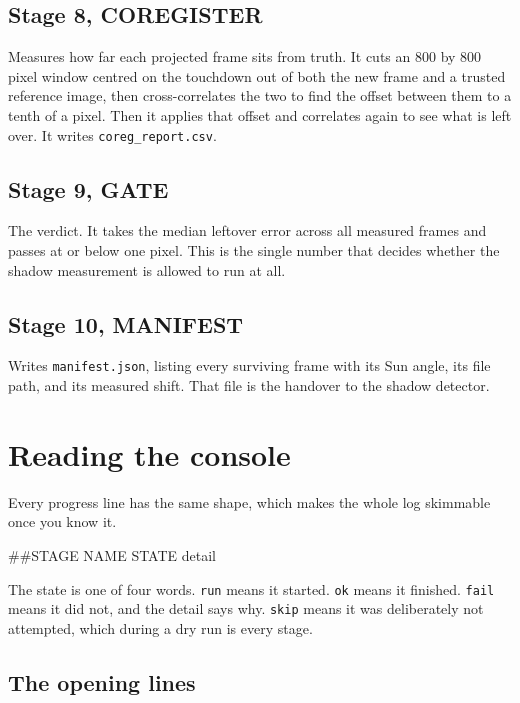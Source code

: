 \documentclass[11pt]{article}
\begin{document}
\subsection{Stage 8, COREGISTER}
Measures how far each projected frame sits from truth. It cuts an 800 by 800 pixel
window centred on the touchdown out of both the new frame and a trusted reference
image, then cross-correlates the two to find the offset between them to a tenth of a
pixel. Then it applies that offset and correlates again to see what is left over. It
writes \texttt{coreg\_report.csv}.

\subsection{Stage 9, GATE}
The verdict. It takes the median leftover error across all measured frames and passes
at or below one pixel. This is the single number that decides whether the shadow
measurement is allowed to run at all.

\subsection{Stage 10, MANIFEST}
Writes \texttt{manifest.json}, listing every surviving frame with its Sun angle, its
file path, and its measured shift. That file is the handover to the shadow detector.

\section{Reading the console}

Every progress line has the same shape, which makes the whole log skimmable once you
know it.

\begin{center}
\ttfamily \#\#STAGE \quad NAME \quad STATE \quad detail
\end{center}

The state is one of four words. \texttt{run} means it started. \texttt{ok} means it
finished. \texttt{fail} means it did not, and the detail says why. \texttt{skip}
means it was deliberately not attempted, which during a dry run is every stage.

\subsection{The opening lines}
\end{document}

